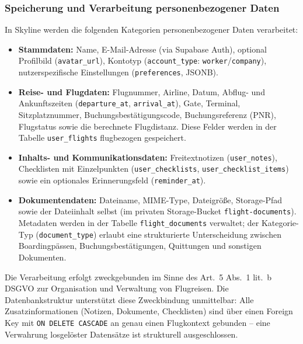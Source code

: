 \subsubsection{Speicherung und Verarbeitung personenbezogener Daten}

In Skyline werden die folgenden Kategorien personenbezogener Daten verarbeitet:

\begin{itemize}
  \item \textbf{Stammdaten:} Name, E-Mail-Adresse (via Supabase Auth),
        optional Profilbild (\texttt{avatar\_url}), Kontotyp
        (\texttt{account\_type}: \texttt{worker}/\texttt{company}),
        nutzerspezifische Einstellungen (\texttt{preferences}, JSONB).

  \item \textbf{Reise- und Flugdaten:} Flugnummer, Airline, Datum,
        Abflug- und Ankunftszeiten (\texttt{departure\_at},
        \texttt{arrival\_at}), Gate, Terminal, Sitzplatznummer,
        Buchungsbestätigungscode, Buchungsreferenz (PNR),
        Flugstatus sowie die berechnete Flugdistanz.
        Diese Felder werden in der Tabelle \texttt{user\_flights}
        flugbezogen gespeichert.

  \item \textbf{Inhalts- und Kommunikationsdaten:} Freitextnotizen
        (\texttt{user\_notes}), Checklisten mit Einzelpunkten
        (\texttt{user\_checklists}, \texttt{user\_checklist\_items})
        sowie ein optionales Erinnerungsfeld (\texttt{reminder\_at}).

  \item \textbf{Dokumentendaten:} Dateiname, MIME-Type, Dateigröße,
        Storage-Pfad sowie der Dateiinhalt selbst (im privaten
        Storage-Bucket \texttt{flight-documents}).
        Metadaten werden in der Tabelle \texttt{flight\_documents}
        verwaltet; der Kategorie-Typ (\texttt{document\_type}) erlaubt
        eine strukturierte Unterscheidung zwischen Boardingpässen,
        Buchungsbestätigungen, Quittungen und sonstigen Dokumenten.
\end{itemize}

Die Verarbeitung erfolgt zweckgebunden im Sinne des Art.~5 Abs.~1
lit.~b DSGVO zur Organisation und Verwaltung von Flugreisen.
Die Datenbankstruktur unterstützt diese Zweckbindung unmittelbar:
Alle Zusatzinformationen (Notizen, Dokumente, Checklisten) sind über
einen Foreign Key mit \texttt{ON DELETE CASCADE} an genau einen
Flugkontext gebunden -- eine Verwahrung losgelöster Datensätze ist
strukturell ausgeschlossen.

